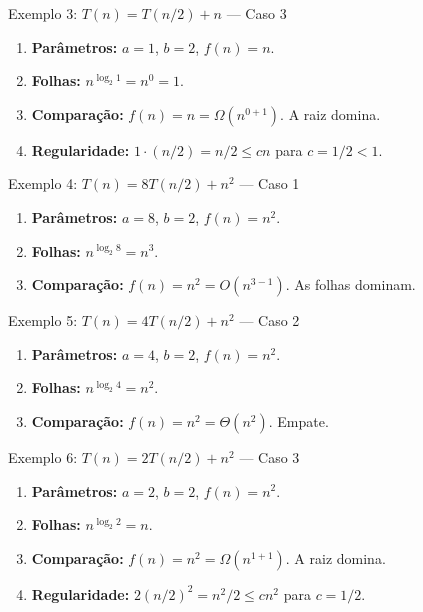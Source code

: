 \documentclass[aspectratio=169]{beamer}
\begin{document}
\begin{frame}{Exemplo 3: $T(n) = T(n/2) + n$ {\normalfont\small--- Caso 3}}
    \begin{enumerate}
        \item \textbf{Parâmetros:} $a = 1$, $b = 2$, $f(n) = n$.
        \item \textbf{Folhas:} $n^{\log_2 1} = n^0 = 1$.
        \item \textbf{Comparação:} $f(n) = n = \Omega(n^{0+1})$. A raiz domina.
        \item \textbf{Regularidade:} $1 \cdot (n/2) = n/2 \le cn$ para $c = 1/2 < 1$. \checkmark
    \end{enumerate}
    \hfill{}
\end{frame}

\begin{frame}{Exemplo 4: $T(n) = 8T(n/2) + n^2$ {\normalfont\small--- Caso 1}}
    \begin{enumerate}
        \item \textbf{Parâmetros:} $a = 8$, $b = 2$, $f(n) = n^2$.
        \item \textbf{Folhas:} $n^{\log_2 8} = n^3$.
        \item \textbf{Comparação:} $f(n) = n^2 = O(n^{3-1})$. As folhas dominam.
    \end{enumerate}
    \hfill{}
\end{frame}

\begin{frame}{Exemplo 5: $T(n) = 4T(n/2) + n^2$ {\normalfont\small--- Caso 2}}
    \begin{enumerate}
        \item \textbf{Parâmetros:} $a = 4$, $b = 2$, $f(n) = n^2$.
        \item \textbf{Folhas:} $n^{\log_2 4} = n^2$.
        \item \textbf{Comparação:} $f(n) = n^2 = \Theta(n^2)$. Empate.
    \end{enumerate}
    \hfill{}
\end{frame}

\begin{frame}{Exemplo 6: $T(n) = 2T(n/2) + n^2$ {\normalfont\small--- Caso 3}}
    \begin{enumerate}
        \item \textbf{Parâmetros:} $a = 2$, $b = 2$, $f(n) = n^2$.
        \item \textbf{Folhas:} $n^{\log_2 2} = n$.
        \item \textbf{Comparação:} $f(n) = n^2 = \Omega(n^{1+1})$. A raiz domina.
        \item \textbf{Regularidade:} $2(n/2)^2 = n^2/2 \le cn^2$ para $c = 1/2$. \checkmark
    \end{enumerate}
    \hfill{}
\end{frame}
\end{document}
